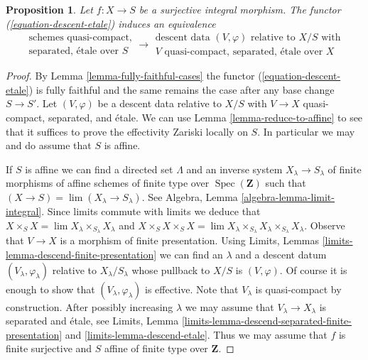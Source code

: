 \documentclass{stacks-project}
\theoremstyle{plain}
\newtheorem{proposition}[subsection]{Proposition}
\theoremstyle{definition}
\theoremstyle{remark}
\numberwithin{equation}{subsection}
\def\lim{\mathop{\mathrm{lim}}\nolimits}
\def\Spec{\mathop{\mathrm{Spec}}}
\begin{document}
\begin{proposition}
\label{proposition-effective}
Let $f : X \to S$ be a surjective integral morphism.
The functor (\ref{equation-descent-etale}) induces an equivalence
$$
\begin{matrix}
\text{schemes quasi-compact,}\\
\text{separated, \'etale over }S
\end{matrix}
\longrightarrow
\begin{matrix}
\text{descent data }(V, \varphi)\text{ relative to }X/S\text{ with}\\
V\text{ quasi-compact, separated, \'etale over }X
\end{matrix}
$$
\end{proposition}

\begin{proof}
By Lemma \ref{lemma-fully-faithful-cases} the
functor (\ref{equation-descent-etale})
is fully faithful and the same remains the case after any
base change $S \to S'$. Let $(V, \varphi)$ be a descent data
relative to $X/S$ with $V \to X$ quasi-compact, separated, and \'etale.
We can use Lemma \ref{lemma-reduce-to-affine}
to see that it suffices to prove the effectivity 
Zariski locally on $S$. In particular we may and do
assume that $S$ is affine.

\medskip\noindent
If $S$ is affine we can find a directed set $\Lambda$ and
an inverse system $X_\lambda \to S_\lambda$
of finite morphisms of affine schemes of finite type over
$\Spec(\mathbf{Z})$ such that $(X \to S) = \lim (X_\lambda \to S_\lambda)$.
See Algebra, Lemma \ref{algebra-lemma-limit-integral}.
Since limits commute with limits we deduce that
$X \times_S X = \lim X_\lambda \times_{S_\lambda} X_\lambda$
and 
$X \times_S X \times_S X = \lim
X_\lambda \times_{S_\lambda} X_\lambda \times_{S_\lambda} X_\lambda$.
Observe that $V \to X$ is a morphism of finite presentation.
Using Limits, Lemmas \ref{limits-lemma-descend-finite-presentation}
we can find an $\lambda$ and a descent datum $(V_\lambda, \varphi_\lambda)$
relative to $X_\lambda/S_\lambda$ whose pullback to $X/S$ is
$(V, \varphi)$. Of course it is enough to show that
$(V_\lambda, \varphi_\lambda)$ is effective. Note that $V_\lambda$
is quasi-compact by construction.
After possibly increasing $\lambda$ we may assume
that $V_\lambda \to X_\lambda$ is separated and \'etale, see
Limits, Lemma \ref{limits-lemma-descend-separated-finite-presentation} and
\ref{limits-lemma-descend-etale}.
Thus we may assume that $f$ is finite surjective and
$S$ affine of finite type over $\mathbf{Z}$.


\end{proof}
\end{document}
